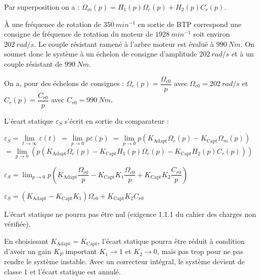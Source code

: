 \begin{multicols}{2}
\begin{corrige}
Par superposition on a : $\Omega_m (p)=H_1 (p) \Omega_c (p)+H_2 (p) C_r (p)$.
\end{corrige}
\else
\fi


À une fréquence de rotation de $\SI{350}{min^{-1}}$ en sortie de BTP correspond une consigne de fréquence de rotation du moteur de $\SI{1 928}{min^{-1}}$ soit environ $\SI{202}{rad/s}$. Le couple résistant ramené à l'arbre moteur est évalué à $\SI{990}{Nm}$. On soumet donc le système à un échelon de consigne d'amplitude $\SI{202}{rad/s}$ et à un couple résistant de $\SI{990}{Nm}$.

\ifprof
\begin{corrige}

On a, pour des échelons de consignes :
$\Omega_c (p)=\dfrac{\Omega_{c0}}{p}$	avec $\Omega_{c0}=\SI{202}{rad/s}$	et	$C_r (p)=\dfrac{C_{r0}}{p}$	avec $C_{r0}=\SI{990}{N m}$.

L’écart statique $\varepsilon_S$  s’écrit en sortie du comparateur :

$\varepsilon_S= \lim\limits_{t\to \infty} \varepsilon(t)$  
$=\lim\limits_{p\to 0} p \varepsilon(p)$
$=\lim\limits_{p\to0} p (K_{\text{Adapt}}\Omega_c (p)-K_{\text{Capt}} \Omega_m (p))$
$=\lim\limits_{p\to 0}  \left(p (K_{\text{Adapt}} \Omega_c (p)-K_{\text{Capt}} H_1 (p) \Omega_c (p)-K_{\text{Capt}} H_2 (p) C_r (p))\right)$

$\varepsilon_S=\lim_{p\to 0}  p \left(K_{\text{Adapt}} \dfrac{\Omega_{c0}}{p}-K_{\text{Capt}} K_1 \dfrac{\Omega_{c0}}{p}+K_{\text{Capt}} K_2 \dfrac{C_{r0}}{p}\right)$

$\varepsilon_S=\left(K_{\text{Adapt}}-K_{\text{Capt}} K_1 \right)\Omega_{c0}+ K_{\text{Capt}} K_2C_{r0}$

L’écart statique ne pourra pas être nul (exigence 1.1.1 du cahier des charges non vérifiée).


\end{corrige}
\else
\fi


\ifprof
\begin{corrige}
En choisissant $K_{\text{Adapt}}=K_{\text{Capt}}$, l’écart statique pourra être réduit à condition d’avoir un gain $K_P$ important $K_1\to 1$ et $K_2\to 0$, mais pas trop pour ne pas rendre le système instable.
Avec un correcteur intégral, le système devient de classe 1 et l’écart statique est annulé.
\end{corrige}
\else
\fi



\end{multicols}
